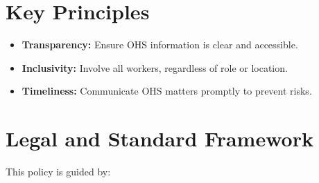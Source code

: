 \documentclass[11pt]{article}
\begin{document}
\section{Key Principles}
\begin{itemize}
    \item \textbf{Transparency:} Ensure OHS information is clear and accessible.
    \item \textbf{Inclusivity:} Involve all workers, regardless of role or location.
    \item \textbf{Timeliness:} Communicate OHS matters promptly to prevent risks.
\end{itemize}

\section{Legal and Standard Framework}
This policy is guided by:
\end{document}
